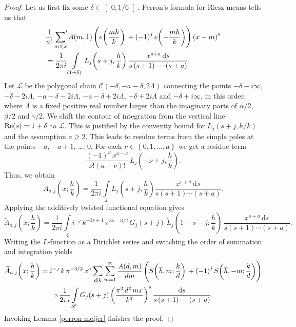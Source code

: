 \documentclass[a4paper,10pt,twoside]{amsart}
\theoremstyle{definition}
\numberwithin{equation}{section}
\renewcommand{\Re}{\textnormal{Re}}
\renewcommand\:{\colon}
\newcommand{\sump}{\mathop{{\sum}^{\raisebox{-3pt}{\makebox[0pt][l]{$'$}}}}}
\begin{document}
\begin{proof}
Let us first fix some $\delta\in\left]0,1/6\right[$. Perron's formula for Riesz means tells us that
\begin{align*}
&\frac1{a!}\sump_{m\leqslant x}A(m,1)\left(e\!\left(\frac{mh}k\right)\vphantom{\Bigg|}+\left(-1\right)^je\!\left(-\frac{mh}k\right)\right)\left(x-m\right)^a \\
&=\frac1{2\pi i}\int\limits_{\left(1+\delta\right)}L_j\!\left(s+j,\frac hk\right)\frac{x^{s+a}\,\mathrm ds}{s\left(s+1\right)\cdots\left(s+a\right)}.
\end{align*}
Let $\mathscr L$ be the polygonal chain $\mathscr C(-\delta,-a-\delta,2\Lambda)$ connecting the points $-\delta-i\infty$, $-\delta-2i\Lambda$, $-a-\delta-2i\Lambda$, $-a-\delta+2i\Lambda$, $-\delta+2i\Lambda$ and $-\delta+i\infty$, in this order, where $\Lambda$ is a fixed positive real number larger than the imaginary parts of $\alpha/2$, $\beta/2$ and $\gamma/2$. We shift the contour of integration from the vertical line $\Re(s)=1+\delta$ to $\mathscr L$. This is justified by the convexity bound for $L_j(s+j,h/k)$ and the assumption $a\geqslant 2$. This leads to residue terms from the simple poles at the points $-a$, $-a+1$, \dots, $0$. For each $\nu\in\left\{0,1,\ldots,a\right\}$ we get a residue term
\[\frac{\left(-1\right)^\nu\,x^{a-\nu}}{\nu!\left(a-\nu\right)!}\,L_j\!\left(-\nu+j,\frac hk\right).\]
Thus, we obtain
\[\widetilde A_{a,j}\!\left(x;\frac hk\right)
=\frac1{2\pi i}\int\limits_{\mathscr L}L_j\!\left(s+j,\frac hk\right)\frac{x^{s+a}\,\mathrm ds}{s\left(s+1\right)\cdots\left(s+a\right)}.\]
Applying the additively twisted functional equation gives
\[\widetilde A_{a,j}\!\left(x;\frac hk\right)
=\frac1{2\pi i}\int\limits_{\mathscr L}i^{-j}\,k^{-3s+1}\,\pi^{3s-3/2}\,G_j(s+j)\,\widetilde L_j\!\left(1-s-j;\frac{\overline h}k\right)\,\frac{x^{s+a}\,\mathrm ds}{s\left(s+1\right)\cdots\left(s+a\right)}.\]
Writing the $L$-function as a Dirichlet series and switching the order of summation and integration yields
\begin{multline*}  
\widetilde A_{a,j}\!\left(x;\frac hk\right)
=i^{-j}\,k\,\pi^{-3/2}\,x^a\sum_{d\mid k}\sum_{m=1}^\infty\frac{A(d,m)}{dm}\left(S\!\left(\overline h,m;\frac kd\right)\vphantom{\Bigg|}+\left(-1\right)^jS\!\left(\overline h,-m;\frac kd\right)\right)\\
\times\frac1{2\pi i}\int\limits_{\mathscr L}
G_j(s+j)\left(\frac{\pi^3\,d^2\,mx}{k^3}\right)^s\frac{\mathrm ds}{s\left(s+1\right)\cdots\left(s+a\right)}.
\end{multline*}
Invoking Lemma \ref{perron-meijer} finishes the proof.
\end{proof}
       
\end{document}
